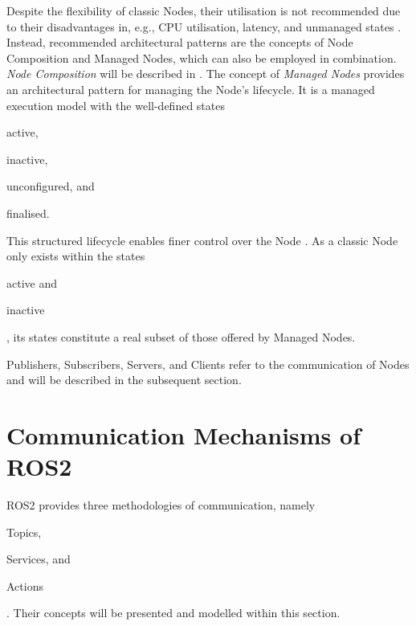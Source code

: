    Despite the flexibility of classic Nodes, their utilisation is not recommended due to their disadvantages in, e.g., CPU utilisation, latency, and unmanaged states \cite[p.~6]{ROS2usesInTheWild}. Instead, recommended architectural patterns are the concepts of Node Composition and Managed Nodes, which can also be employed in combination. \emph{Node Composition} will be described in . The concept of \emph{Managed Nodes} provides an architectural pattern for managing the Node's lifecycle. It is a managed execution model with the well-defined states
    \begin{enumerate*}[label=\Alph*)]
        \item \glqq{}active\grqq{},
        \item \glqq{}inactive\grqq{},
        \item \glqq{}unconfigured\grqq{}, and
        \item \glqq{}finalised\grqq{}.
    \end{enumerate*}
    This structured lifecycle enables finer control over the Node \cite[p.~4]{ROS2usesInTheWild}\cite{website:lifecycleNode}. As a classic Node only exists within the states 
    \begin{enumerate*}[label=\Alph*)]
        \item \glqq{}active\grqq{} and
        \item \glqq{}inactive\grqq{}
    \end{enumerate*}, its states constitute a real subset of those offered by Managed Nodes.

    Publishers, Subscribers, Servers, and Clients refer to the communication of Nodes and will be described in the subsequent section.

\section{Communication Mechanisms of ROS2} \label{sec:model:communication}
    ROS2 provides three methodologies of communication, namely
    \begin{enumerate*}[label=\Alph*)]
        \item Topics,
        \item Services, and
        \item Actions
    \end{enumerate*} \cite[p.~3]{ROS2usesInTheWild}. Their concepts will be presented and modelled within this section.


